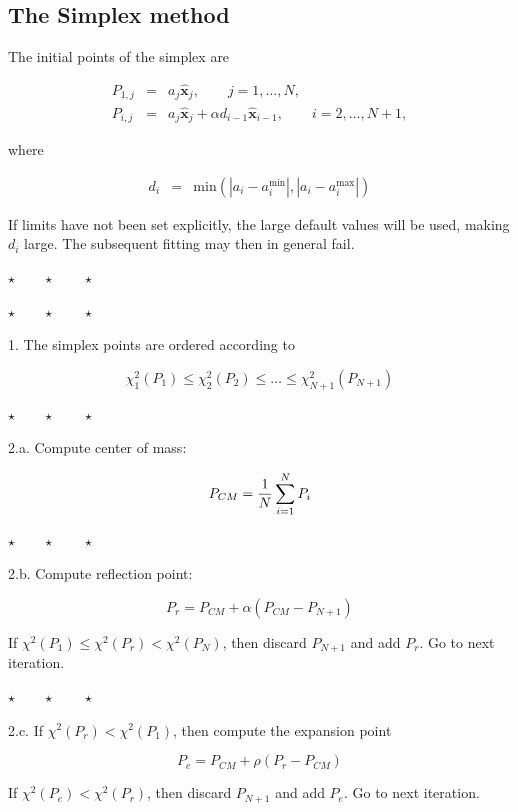\documentclass[a4paper,12pt,onecolumn]{article}
\def\xhat{\mathbf{\widehat{x}}}
\newcommand{\stars}{\begin{center} \vspace{0.5cm}$\star \qquad \star \qquad \star$\vspace{0.5cm}\end{center}}
\begin{document}
\subsection{The Simplex method}

The initial points of the simplex are

\begin{eqnarray}
P_{1,j} &=& a_j \xhat_j, \qquad j=1, \ldots, N, \\
P_{i,j} &=& a_j \xhat_j + \alpha d_{i-1} \xhat_{i-1}, \qquad i=2, \ldots, N+1,
\end{eqnarray}

where

\begin{eqnarray}
d_i &=& \mathrm{min}( |a_i - a_i^\mathrm{min}|, |a_i - a_i^\mathrm{max}|)
\end{eqnarray}

If limits have not been set explicitly, the large default values will be used,
making $d_i$ large. The subsequent fitting may then in general fail.


\stars
\stars

1. The simplex points are ordered according to

\begin{equation}
\chi^2_1(P_1) \leq \chi^2_2(P_2) \leq \ldots \leq \chi^2_{N+1}(P_{N+1})
\end{equation}

\stars

2.a. Compute center of mass:

\begin{equation}
P_{CM} = {1 \over N} \sum_{i=1}^N P_i
\end{equation}

\stars

2.b. Compute reflection point:

\begin{equation}
P_r = P_{CM} + \alpha ( P_{CM} - P_{N+1})
\end{equation}

If $\chi^2(P_1) \leq \chi^2(P_r) < \chi^2(P_N)$, then discard $P_{N+1}$ and
add $P_r$. Go to next iteration.

\stars

2.c. If $\chi^2(P_r) < \chi^2(P_1)$, then compute the expansion point

\begin{equation}
P_e = P_{CM} + \rho (P_r - P_{CM})
\end{equation}

If $\chi^2(P_e) < \chi^2(P_r)$, then discard $P_{N+1}$ and
add $P_e$. Go to next iteration.
\end{document}
